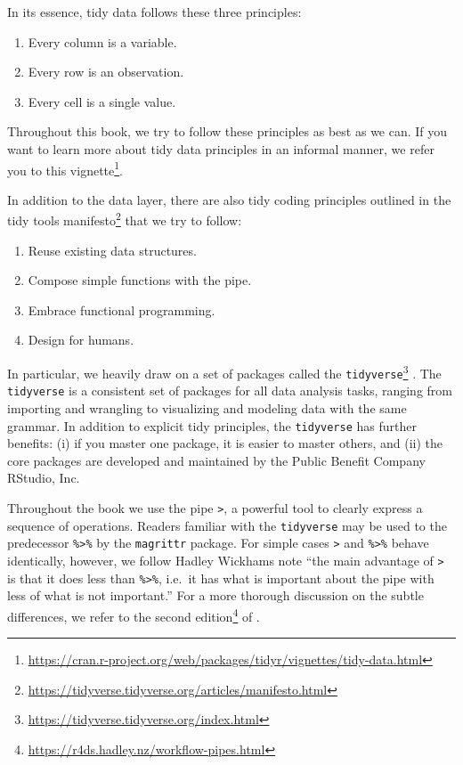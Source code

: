 \documentclass[
]{book}
\providecommand{\tightlist}{%
  \setlength{\itemsep}{0pt}\setlength{\parskip}{0pt}}
\renewcommand{\href}[2]{#2\footnote{\url{#1}}}
\begin{document}
In its essence, tidy data follows these three principles:

\begin{enumerate}
\def\labelenumi{\arabic{enumi}.}
\tightlist
\item
  Every column is a variable.
\item
  Every row is an observation.
\item
  Every cell is a single value.
\end{enumerate}

Throughout this book, we try to follow these principles as best as we can. If you want to learn more about tidy data principles in an informal manner, we refer you to \href{https://cran.r-project.org/web/packages/tidyr/vignettes/tidy-data.html}{this vignette}.

In addition to the data layer, there are also tidy coding principles outlined in \href{https://tidyverse.tidyverse.org/articles/manifesto.html}{the tidy tools manifesto} that we try to follow:

\begin{enumerate}
\def\labelenumi{\arabic{enumi}.}
\tightlist
\item
  Reuse existing data structures.
\item
  Compose simple functions with the pipe.
\item
  Embrace functional programming.
\item
  Design for humans.
\end{enumerate}

In particular, we heavily draw on a set of packages called the \href{https://tidyverse.tidyverse.org/index.html}{\texttt{tidyverse}} \citep{Wickham2019}. The \texttt{tidyverse} is a consistent set of packages for all data analysis tasks, ranging from importing and wrangling to visualizing and modeling data with the same grammar. In addition to explicit tidy principles, the \texttt{tidyverse} has further benefits: (i) if you master one package, it is easier to master others, and (ii) the core packages are developed and maintained by the Public Benefit Company RStudio, Inc.~

Throughout the book we use the pipe \texttt{\textbar{}\textgreater{}}, a powerful tool to clearly express a sequence of operations. Readers familiar with the \texttt{tidyverse} may be used to the predecessor \texttt{\%\textgreater{}\%} by the \texttt{magrittr} package. For simple cases \texttt{\textbar{}\textgreater{}} and \texttt{\%\textgreater{}\%} behave identically, however, we follow Hadley Wickhams note ``the main advantage of \texttt{\textbar{}\textgreater{}} is that it does less than \texttt{\%\textgreater{}\%}, i.e.~it has what is important about the pipe with less of what is not important.'' For a more thorough discussion on the subtle differences, we refer to the \href{https://r4ds.hadley.nz/workflow-pipes.html}{second edition} of \citet{Wickham2016}.
\end{document}

